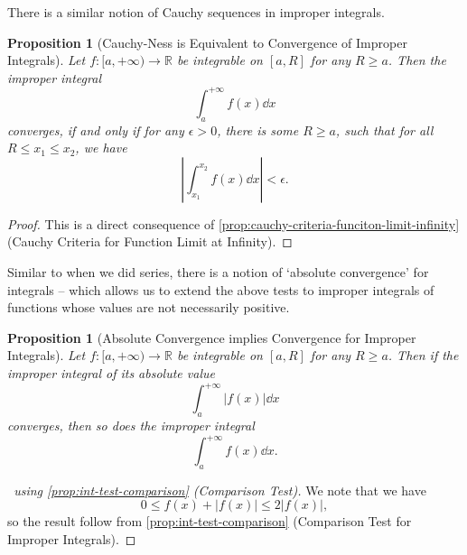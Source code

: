 \documentclass[11pt]{article}
\numberwithin{equation}{section}
\newtheorem{proposition}[theorem]{Proposition}
\theoremstyle{definition}
\theoremstyle{remark}
\newcommand{\pqty}[1]{\left(#1\right)}
\newcommand{\abs}[1]{\left|#1\right|}
\newcommand{\ccintv}[2]{[#1,#2]}
\newcommand{\cointv}[2]{[#1,#2)}
\newcommand{\functiondomain}[3]{#1:#2\to #3}
\newcommand{\RR}{\mathbb R}
\newcommand{\plusinfty}{+\infty}
\begin{document}
There is a similar notion of Cauchy sequences in improper integrals.

\begin{proposition}[Cauchy-Ness is Equivalent to Convergence of Improper Integrals]\label{analysis-unit-0191}
    \label{prop:int-cauchy}%
    Let \(\functiondomain{f}{\cointv{a}{\plusinfty}}{\RR}\) be integrable on \(\ccintv{a}{R}\) for any \(R \geq a\). Then the improper integral
    \[
        \int_{a}^{\plusinfty} f\pqty{x} \dd{x}
    \]
    converges, if and only if for any \(\epsilon > 0\), there is some \(R \geq a\), such that for all \(R \leq x_1 \leq x_2\), we have
    \[
        \abs{\int_{x_1}^{x_2} f\pqty{x} \dd{x}} < \epsilon.
    \]
\end{proposition}

\begin{proof}
    This is a direct consequence of \autoref{prop:cauchy-criteria-funciton-limit-infinity} (Cauchy Criteria for Function Limit at Infinity).
\end{proof}

Similar to when we did series, there is a notion of `absolute convergence' for integrals -- which allows us to extend the above tests to improper integrals of functions whose values are not necessarily positive.

\begin{proposition}[Absolute Convergence implies Convergence for Improper Integrals]\label{analysis-unit-0192}
    \label{prop:int-absolute-convergence}%
    Let \(\functiondomain{f}{\cointv{a}{\plusinfty}}{\RR}\) be integrable on \(\ccintv{a}{R}\) for any \(R \geq a\). Then if the improper integral of its absolute value
    \[
        \int_{a}^{\plusinfty} \abs{f\pqty{x}} \dd{x}
    \]
    converges, then so does the improper integral
    \[
        \int_{a}^{\plusinfty} f\pqty{x} \dd{x}.
    \]
\end{proposition}

\begin{proof}[\proofname\ using \autoref{prop:int-test-comparison} (Comparison Test)]
    We note that we have
    \[
        0 \leq f\pqty{x} + \abs{f\pqty{x}} \leq 2 \abs{f\pqty{x}},
    \]
    so the result follow from \autoref{prop:int-test-comparison} (Comparison Test for Improper Integrals).
\end{proof}
\end{document}
